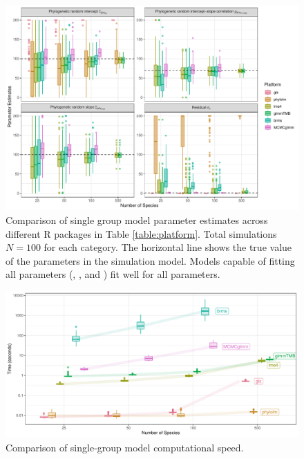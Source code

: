 \documentclass[12pt]{article}
\begin{document}
\begin{center}
\begin{figure}[H]
  \includegraphics[scale=0.7]{./figure/ssplot.pdf}
  \caption{Comparison of single group model parameter estimates across different R packages in Table \ref{table:platform}.
    Total simulations $N=100$ for each category. The horizontal line shows the true value of the parameters in the simulation model. Models capable of fitting all parameters (,  , and ) fit well for all parameters.
}
\label{ssplot}
\end{figure}
\end{center}
\begin{center}
\begin{figure}[H]
  \includegraphics[scale=0.7]{./figure/sstime.pdf}
  \caption{Comparison of single-group model computational speed.}
\label{ssplot_speed}
\end{figure}
\end{center}
\end{document}
